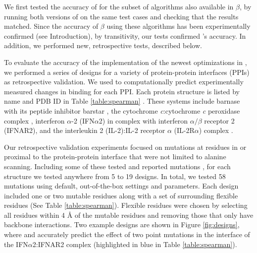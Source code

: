 We first tested the accuracy of  for the subset of algorithms also available in $\beta$, by running both versions of \osprey on the same test cases and checking that the results matched.  Since the accuracy of $\beta$ using these algorithms has been experimentally confirmed (see Introduction), by transitivity, our tests confirmed 's accuracy.  In addition, we performed new, retrospective tests, described below.    

To evaluate the accuracy of the implementation of the newest optimizations in , we performed a series of designs for a variety of protein-protein interfaces (PPIs) as retrospective validation. We used \ks \cite{K*} to computationally predict experimentally measured changes in binding for each PPI. Each protein structure is listed by name and PDB ID in Table \ref{table:spearman} \cite{pdb1x1u,pdb2pcb,pdb3s9d,pdb2b5i}.  These systems include barnase with its peptide inhibitor barstar \cite{binding2barnase,bindingbarnase}, the cytochrome {\it c}:cytochrome {\it c} peroxidase complex \cite{bindingcytc}, interferon $\alpha$-2 (IFN$\alpha$2) in complex with interferon $\alpha/\beta$ receptor 2 (IFNAR2)\cite{bindingifna2}, and the interleukin 2 (IL-2):IL-2 receptor $\alpha$ (IL-2R$\alpha$) complex \cite{bindingil2}.

Our retrospective validation experiments focused on mutations at residues in or proximal to the protein-protein interface that were not limited to alanine scanning. Including some of these tested and reported mutations \cite{binding2barnase,bindingbarnase,bindingcytc,bindingifna2,bindingil2}, for each structure we tested anywhere from 5 to 19 designs. In total, we tested 58 mutations using default, out-of-the-box  settings and parameters. Each design included one or two mutable residues along with a set of surrounding flexible residues (See Table \ref{table:spearman}). Flexible residues were chosen by selecting all residues within 4 {\AA} of the mutable residues and removing those that only have backbone interactions. Two example designs are shown in Figure \ref{fig:designs}, where  and \ks accurately predict the effect of two point mutations in the interface of the IFN$\alpha$2:IFNAR2 complex (highlighted in blue in Table \ref{table:spearman}). 

